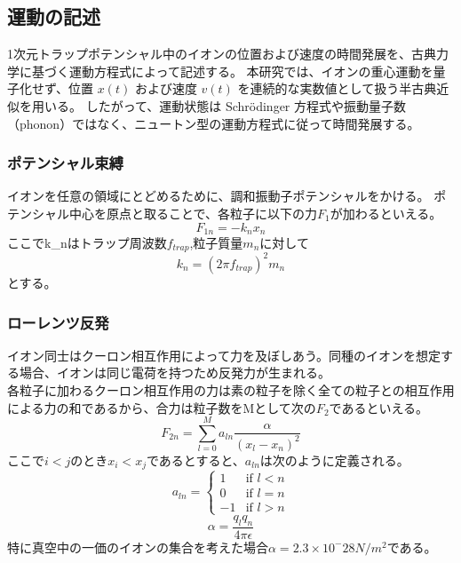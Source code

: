 \subsection{運動の記述}
    1次元トラップポテンシャル中のイオンの位置および速度の時間発展を、古典力学に基づく運動方程式によって記述する。
    本研究では、イオンの重心運動を量子化せず、位置 $x(t)$ および速度 $v(t)$ を連続的な実数値として扱う半古典近似を用いる。
    したがって、運動状態は Schr\"odinger 方程式や振動量子数（phonon）ではなく、ニュートン型の運動方程式に従って時間発展する。
\subsubsection{ポテンシャル束縛}
    イオンを任意の領域にとどめるために、調和振動子ポテンシャルをかける。
    ポテンシャル中心を原点と取ることで、各粒子に以下の力$F_1$が加わるといえる。
    \begin{equation}
        F_{1n} = -k_nx_n
    \end{equation}
    ここでk_nはトラップ周波数$f_{trap}$,粒子質量$m_n$に対して
    \begin{equation}
        k_n = (2\pi f_{trap})^2 m_n
    \end{equation}
    とする。\\
\subsubsection{ローレンツ反発}
    イオン同士はクーロン相互作用によって力を及ぼしあう。同種のイオンを想定する場合、イオンは同じ電荷を持つため反発力が生まれる。\\
    各粒子に加わるクーロン相互作用の力は素の粒子を除く全ての粒子との相互作用による力の和であるから、合力は粒子数をMとして次の$F_2$であるといえる。\\
    \begin{equation}
        F_{2n} = \sum_{l=0}^M a_{ln} \frac{\alpha}{(x_l-x_n)^2}
    \end{equation}
    ここで$i<j$のとき$x_i < x_j$であるとすると、$a_{ln}$は次のように定義される。
    \begin{equation}
        a_{ln} =
        \begin{cases}
            1 & \text{if } l < n \\
            0 & \text{if } l = n \\
            -1 & \text{if } l > n
        \end{cases}
    \end{equation}
    \begin{equation}
        \alpha=\frac{q_l q_n}{4\pi \epsilon}
    \end{equation}
    特に真空中の一価のイオンの集合を考えた場合$\alpha=2.3\times10^-28N/m^2$である。
